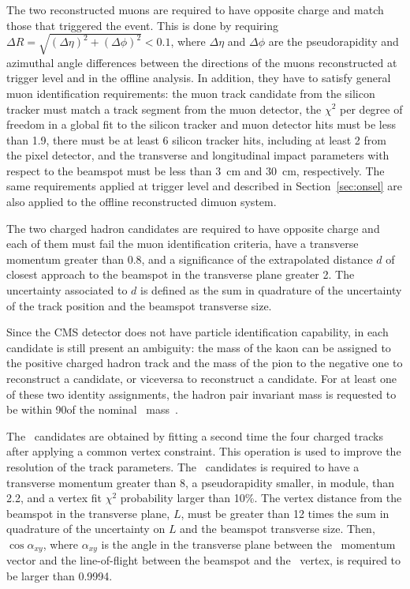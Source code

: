 The two reconstructed muons are required to have opposite charge and match those that triggered the event. This is done by requiring $\Delta R = \sqrt{(\Delta\eta)^2+(\Delta\phi)^2}<0.1$, where $\Delta\eta$ and $\Delta\phi$ are the pseudorapidity and azimuthal angle differences between the directions of the muons reconstructed at trigger level and in the offline analysis.
In addition, they have to satisfy general muon identification requirements: the muon track candidate from the silicon  tracker must match a track segment from the muon detector, the $\chi^2$ per degree of freedom in a global fit to the silicon tracker and muon detector hits must be less than 1.9, there must be at least 6 silicon tracker hits, including at least 2 from the pixel detector, and the transverse and longitudinal impact parameters with respect to the beamspot must be less than \SI{3}{\centi\metre} and \SI{30}{\centi\metre}, respectively.
The same requirements applied at trigger level and described in Section~\ref{sec:onsel} are also applied to the offline reconstructed dimuon system.

The two charged hadron candidates are required to have opposite charge and each of them must fail the muon identification criteria, have a transverse momentum greater than 0.8\GeV, and a significance of the extrapolated distance $d$ of closest approach to the beamspot in the transverse plane greater 2. The uncertainty associated to $d$ is defined as the sum in quadrature of the uncertainty of the track position and the beamspot transverse size.

Since the CMS detector does not have particle identification capability, in each candidate is still present an ambiguity: the mass of the kaon can be assigned to the positive charged hadron track and the mass of the pion to the negative one to reconstruct a \cPKstz candidate, or viceversa to reconstruct a \cPAKstz candidate.
For at least one of these two identity assignments, the hadron pair invariant mass is requested to be within 90\MeV of the nominal \cPKstz\ mass~\cite{PDG}.

The \PBz\ candidates are obtained by fitting a second time the four charged tracks after applying a common vertex constraint. This operation is used to improve the resolution of the track parameters.
The \PBz\ candidates is required to have a transverse momentum greater than 8\GeV, a pseudorapidity smaller, in module, than 2.2, and a vertex fit $\chi^2$ probability larger than 10\%.
The vertex distance from the beamspot in the transverse plane, $L$, must be greater than 12 times the sum in quadrature of the uncertainty on $L$ and the beamspot transverse size. Then, $\cos{\alpha_{xy}}$, where $\alpha_{xy}$ is the angle in the transverse plane between the \PBz\ momentum vector and the line-of-flight between the beamspot and the \PBz\ vertex, is required to be larger than 0.9994.

